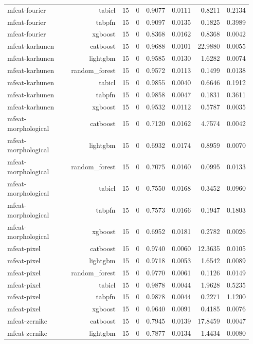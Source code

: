 \begin{table}[htbp]
\begin{tabular}{lrrrrrrr}
mfeat-fourier & tabicl & 15 & 0 & 0.9077 & 0.0111 & 0.8211 & 0.2134 \\
mfeat-fourier & tabpfn & 15 & 0 & 0.9097 & 0.0135 & 0.1825 & 0.3989 \\
mfeat-fourier & xgboost & 15 & 0 & 0.8368 & 0.0162 & 0.8368 & 0.0042 \\
mfeat-karhunen & catboost & 15 & 0 & 0.9688 & 0.0101 & 22.9880 & 0.0055 \\
mfeat-karhunen & lightgbm & 15 & 0 & 0.9585 & 0.0130 & 1.6282 & 0.0074 \\
mfeat-karhunen & random\_forest & 15 & 0 & 0.9572 & 0.0113 & 0.1499 & 0.0138 \\
mfeat-karhunen & tabicl & 15 & 0 & 0.9855 & 0.0040 & 0.6646 & 0.1912 \\
mfeat-karhunen & tabpfn & 15 & 0 & 0.9858 & 0.0047 & 0.1831 & 0.3611 \\
mfeat-karhunen & xgboost & 15 & 0 & 0.9532 & 0.0112 & 0.5787 & 0.0035 \\
mfeat-morphological & catboost & 15 & 0 & 0.7120 & 0.0162 & 4.7574 & 0.0042 \\
mfeat-morphological & lightgbm & 15 & 0 & 0.6932 & 0.0174 & 0.8959 & 0.0070 \\
mfeat-morphological & random\_forest & 15 & 0 & 0.7075 & 0.0160 & 0.0995 & 0.0133 \\
mfeat-morphological & tabicl & 15 & 0 & 0.7550 & 0.0168 & 0.3452 & 0.0960 \\
mfeat-morphological & tabpfn & 15 & 0 & 0.7573 & 0.0166 & 0.1947 & 0.1803 \\
mfeat-morphological & xgboost & 15 & 0 & 0.6952 & 0.0181 & 0.2782 & 0.0026 \\
mfeat-pixel & catboost & 15 & 0 & 0.9740 & 0.0060 & 12.3635 & 0.0105 \\
mfeat-pixel & lightgbm & 15 & 0 & 0.9718 & 0.0053 & 1.6542 & 0.0089 \\
mfeat-pixel & random\_forest & 15 & 0 & 0.9770 & 0.0061 & 0.1126 & 0.0149 \\
mfeat-pixel & tabicl & 15 & 0 & 0.9878 & 0.0044 & 1.9628 & 0.5235 \\
mfeat-pixel & tabpfn & 15 & 0 & 0.9878 & 0.0044 & 0.2271 & 1.1200 \\
mfeat-pixel & xgboost & 15 & 0 & 0.9640 & 0.0091 & 0.4185 & 0.0076 \\
mfeat-zernike & catboost & 15 & 0 & 0.7945 & 0.0139 & 17.8459 & 0.0047 \\
mfeat-zernike & lightgbm & 15 & 0 & 0.7877 & 0.0134 & 1.4434 & 0.0080 \\

\end{tabular}
\end{table}
